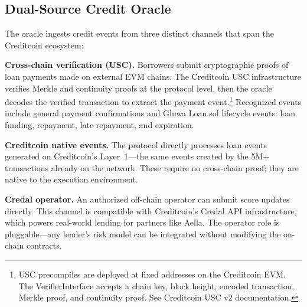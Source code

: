 \documentclass[11pt,a4paper]{article}
\begin{document}
\subsection{Dual-Source Credit Oracle}

The oracle ingests credit events from three distinct channels that span the Creditcoin ecosystem:

\textbf{Cross-chain verification (USC).} Borrowers submit cryptographic proofs of loan payments made on external EVM chains. The Creditcoin USC infrastructure verifies Merkle and continuity proofs at the protocol level, then the oracle decodes the verified transaction to extract the payment event.\footnote{USC precompiles are deployed at fixed addresses on the Creditcoin EVM. The VerifierInterface accepts a chain key, block height, encoded transaction, Merkle proof, and continuity proof. See Creditcoin USC v2 documentation.} Recognized events include general payment confirmations and Gluwa Loan.sol lifecycle events: loan funding, repayment, late repayment, and expiration.

\textbf{Creditcoin native events.} The protocol directly processes loan events generated on Creditcoin's Layer~1---the same events created by the 5M+ transactions already on the network. These require no cross-chain proof; they are native to the execution environment.

\textbf{Credal operator.} An authorized off-chain operator can submit score updates directly. This channel is compatible with Creditcoin's Credal API infrastructure, which powers real-world lending for partners like Aella. The operator role is pluggable---any lender's risk model can be integrated without modifying the on-chain contracts.
\end{document}
